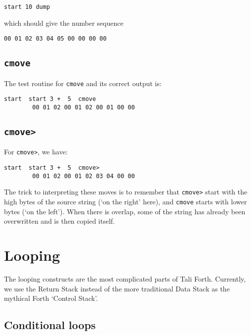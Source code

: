\begin{lstlisting}[frame=lines]
        start 10 dump
\end{lstlisting}

\noindent which should give the number sequence

\begin{lstlisting}[frame=lines]
        00 01 02 03 04 05 00 00 00 00
\end{lstlisting}

\subsection{\texttt{cmove}}

\noindent The test routine for \texttt{cmove} and its correct output is:

\begin{lstlisting}[frame=lines]
        start  start 3 +  5  cmove
        00 01 02 00 01 02 00 01 00 00
\end{lstlisting}

\subsection{\texttt{cmove>}}

\indent For \texttt{cmove>}, we have: 

\begin{lstlisting}[frame=lines]
        start  start 3 +  5  cmove>
        00 01 02 00 01 02 03 04 00 00
\end{lstlisting}

The trick to interpreting these moves is to remember that \texttt{cmove>} start
with the high bytes of the source string (`on the right' here), and
\texttt{cmove} starts with lower bytes (`on the left'). When there is overlap,
some of the string has already been overwritten and is then copied itself.

\section{Looping}

The looping constructs are the most complicated parts of Tali Forth. Currently,
we use the Return Stack instead of the more traditional Data Stack as the
mythical Forth `Control Stack'.


\subsection{Conditional loops}

